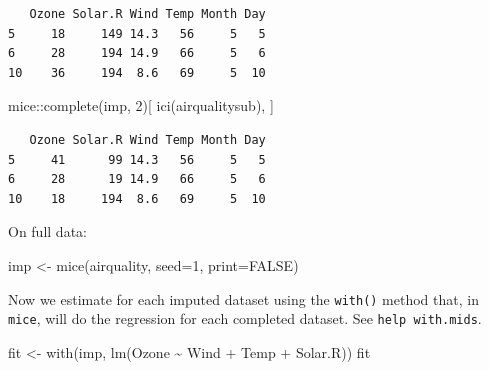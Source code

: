 \documentclass[
  letterpaper,
  DIV=11,
  numbers=noendperiod]{scrreprt}
\newenvironment{Shaded}{\begin{snugshade}}{\end{snugshade}}
\newcommand{\AttributeTok}[1]{\textcolor[rgb]{0.49,0.56,0.16}{#1}}
\newcommand{\ConstantTok}[1]{\textcolor[rgb]{0.53,0.00,0.00}{#1}}
\newcommand{\DecValTok}[1]{\textcolor[rgb]{0.25,0.63,0.44}{#1}}
\newcommand{\FunctionTok}[1]{\textcolor[rgb]{0.02,0.16,0.49}{#1}}
\newcommand{\NormalTok}[1]{\textcolor[rgb]{0.00,0.44,0.13}{#1}}
\newcommand{\OtherTok}[1]{\textcolor[rgb]{0.00,0.44,0.13}{#1}}
\newcommand{\SpecialCharTok}[1]{\textcolor[rgb]{0.25,0.44,0.63}{#1}}
\begin{document}
\begin{verbatim}
   Ozone Solar.R Wind Temp Month Day
5     18     149 14.3   56     5   5
6     28     194 14.9   66     5   6
10    36     194  8.6   69     5  10
\end{verbatim}

\begin{Shaded}
\begin{Highlighting}[]
\NormalTok{  mice}\SpecialCharTok{::}\FunctionTok{complete}\NormalTok{(imp, }\DecValTok{2}\NormalTok{)[ }\FunctionTok{ici}\NormalTok{(airqualitysub), ]}
\end{Highlighting}
\end{Shaded}

\begin{verbatim}
   Ozone Solar.R Wind Temp Month Day
5     41      99 14.3   56     5   5
6     28      19 14.9   66     5   6
10    18     194  8.6   69     5  10
\end{verbatim}

On full data:

\begin{Shaded}
\begin{Highlighting}[]
\NormalTok{  imp }\OtherTok{\textless{}{-}} \FunctionTok{mice}\NormalTok{(airquality, }\AttributeTok{seed=}\DecValTok{1}\NormalTok{, }\AttributeTok{print=}\ConstantTok{FALSE}\NormalTok{)}
\end{Highlighting}
\end{Shaded}

Now we estimate for each imputed dataset using the \texttt{with()}
method that, in \texttt{mice}, will do the regression for each completed
dataset. See \texttt{help\ with.mids}.

\begin{Shaded}
\begin{Highlighting}[]
\NormalTok{  fit }\OtherTok{\textless{}{-}} \FunctionTok{with}\NormalTok{(imp, }\FunctionTok{lm}\NormalTok{(Ozone }\SpecialCharTok{\textasciitilde{}}\NormalTok{ Wind }\SpecialCharTok{+}\NormalTok{ Temp }\SpecialCharTok{+}\NormalTok{ Solar.R))}
\NormalTok{  fit}
\end{Highlighting}
\end{Shaded}
\end{document}
